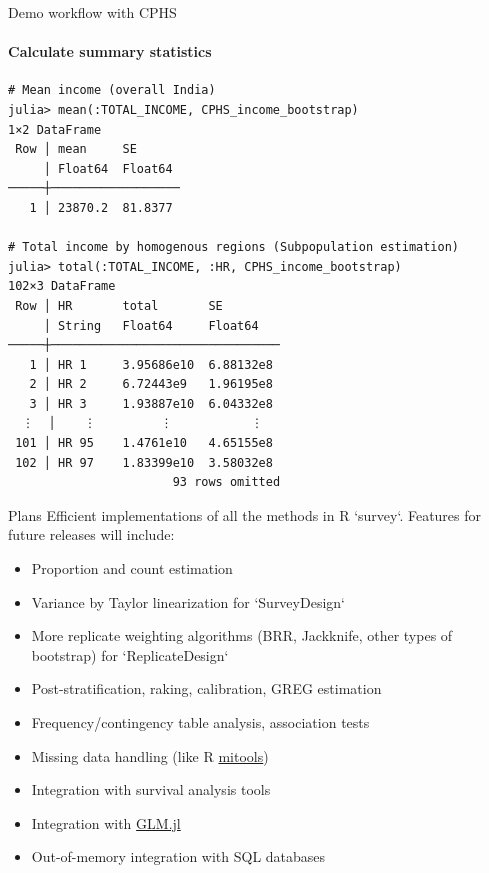 \documentclass{beamer}          %
\begin{document}
\begin{frame}[fragile]{Demo workflow with CPHS}
\framesubtitle{Calculate summary statistics}
\begin{verbatim}
# Mean income (overall India)
julia> mean(:TOTAL_INCOME, CPHS_income_bootstrap) 
1×2 DataFrame
 Row │ mean     SE      
     │ Float64  Float64 
─────┼──────────────────
   1 │ 23870.2  81.8377

# Total income by homogenous regions (Subpopulation estimation)
julia> total(:TOTAL_INCOME, :HR, CPHS_income_bootstrap)
102×3 DataFrame
 Row │ HR       total       SE        
     │ String   Float64     Float64   
─────┼────────────────────────────────
   1 │ HR 1     3.95686e10  6.88132e8
   2 │ HR 2     6.72443e9   1.96195e8
   3 │ HR 3     1.93887e10  6.04332e8
  ⋮  │    ⋮         ⋮           ⋮
 101 │ HR 95    1.4761e10   4.65155e8
 102 │ HR 97    1.83399e10  3.58032e8
                       93 rows omitted
\end{verbatim}
\end{frame}



\begin{frame}{Plans}
	Efficient implementations of all the methods in R `survey`. Features for future releases will include:
	\begin{itemize}
		\item Proportion and count estimation
		\item Variance by Taylor linearization for `SurveyDesign`
		\item More replicate weighting algorithms (BRR, Jackknife, other types of bootstrap) for `ReplicateDesign`
		\item Post-stratification, raking, calibration, GREG estimation
		\item Frequency/contingency table analysis, association tests
		\item Missing data handling (like R \href{https://cran.r-project.org/web/packages/mitools/index.html}{mitools})
		\item Integration with survival analysis tools
		\item Integration with \href{https://github.com/JuliaStats/GLM.jl}{GLM.jl}
		\item Out-of-memory integration with SQL databases
	\end{itemize}
\end{frame}
\end{document}
